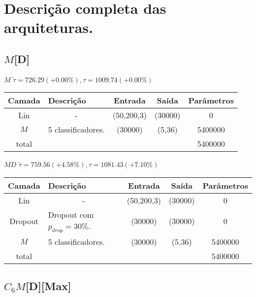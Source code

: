 
\chapter{Descrição completa das arquiteturas.}\label{cap:apendice_arquiteturas}

\begin{tiny}

\section*{$M$[D]}

\begin{table}[H]
	$M$ $\tilde{\tau}=726.29 (+0.00\%), \tau=1009.74 (+0.00\%)$\newline
	\begin{tabularx}{\linewidth}{ |c|X|c|c|c| }
		\hline
		Camada & Descrição & Entrada & Saída & Parâmetros \\ \hline
		Lin & \multicolumn{1}{c|}{-} & (50,200,3) & (30000) & 0 \\ \hline
		$M$ & 5 classificadores. & (30000) & (5,36) & 5400000 \\ \hline
		total &  &  &  & 5400000 \\ \hline
	\end{tabularx}
\end{table}

\begin{table}[H]
	$MD$ $\tilde{\tau}=759.56 (+4.58\%), \tau=1081.43 (+7.10\%)$\newline
	\begin{tabularx}{\linewidth}{ |c|X|c|c|c| }
		\hline
		Camada & Descrição & Entrada & Saída & Parâmetros \\ \hline
		Lin & \multicolumn{1}{c|}{-} & (50,200,3) & (30000) & 0 \\ \hline
		Dropout & Dropout com $p_{drop} = 30\%$. & (30000) & (30000) & 0 \\ \hline
		$M$ & 5 classificadores. & (30000) & (5,36) & 5400000 \\ \hline
		total &  &  &  & 5400000 \\ \hline
	\end{tabularx}
\end{table}

\section*{$C_6M$[D][Max]}


\end{tiny}
